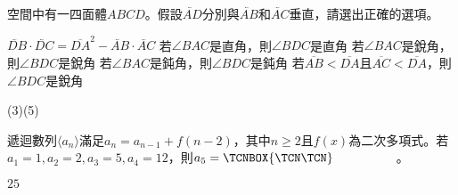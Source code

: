 \begin{QUESTION}
    \begin{QBODY}
        空間中有一四面體$ABCD$。假設$\lvec{AD}$分別與$\lvec{AB}$和$\lvec{AC}$垂直，請選出正確的選項。
        \begin{QOPS}
            \QOP $\lvec{DB}\cdot\lvec{DC} ={{\overline{DA}}^{2}}- \lvec{AB}\cdot \lvec{AC}$
            \QOP 若$\angle BAC$是直角，則$\angle BDC$是直角
            \QOP 若$\angle BAC$是銳角，則$\angle BDC$是銳角
            \QOP 若$\angle BAC$是鈍角，則$\angle BDC$是鈍角
            \QOP 若$\overline{AB}<\overline{DA}$且$\overline{AC}<\overline{DA}$，則$\angle BDC$是銳角
        \end{QOPS}
    \end{QBODY}
    \begin{QFROMS}
    \end{QFROMS}
    \begin{QTAGS}
    \end{QTAGS}
    \begin{QANS}
        (3)(5)
    \end{QANS}
    \begin{QSOL}
    \end{QSOL}
    \begin{QEMPTYSPACE}
    \end{QEMPTYSPACE}
\end{QUESTION}
\begin{QUESTION}
    \begin{QBODY}
        遞迴數列$\langle {{a}_{n}}\rangle $滿足${{a}_{n}}={{a}_{n-1}}+f(n-2)$，其中$n\ge 2$且$f(x)$為二次多項式。若${{a}_{1}}=1,{{a}_{2}}=2,{{a}_{3}}=5,{{a}_{4}}=12$，則${{a}_{5}}= \TCNBOX{ \TCN\TCN }$　　　　　。
        
    \end{QBODY}
    \begin{QFROMS}
    \end{QFROMS}
    \begin{QTAGS}
    \end{QTAGS}
    \begin{QANS}
        $25$
    \end{QANS}
    \begin{QSOL}
    \end{QSOL}
    \begin{QEMPTYSPACE}
    \end{QEMPTYSPACE}
\end{QUESTION}
